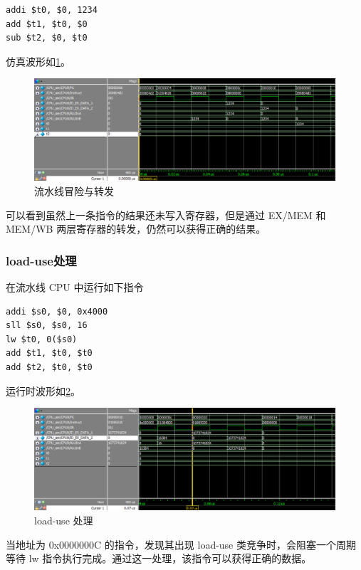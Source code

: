 \documentclass{ctexart}
\begin{document}
\begin{lstlisting}
addi $t0, $0, 1234
add $t1, $t0, $0
sub $t2, $0, $t0
\end{lstlisting}

	仿真波形如\ref{simpicture8}。

	\begin{figure}[ht]
		\centering
		\includegraphics[width = \textwidth]{PipelineTestWave1.eps}
		\caption{流水线冒险与转发}
		\label{simpicture8}
	\end{figure}		

	可以看到虽然上一条指令的结果还未写入寄存器，但是通过 EX/MEM 和 MEM/WB 两层寄存器的转发，仍然可以获得正确的结果。

	\subsubsection{load-use处理}
	
	在流水线 CPU 中运行如下指令

	\begin{lstlisting}
addi $s0, $0, 0x4000
sll $s0, $s0, 16
lw $t0, 0($s0)
add $t1, $t0, $t0
add $t2, $t0, $t0	
	\end{lstlisting}
	
运行时波形如\ref{simpicture9}。

	\begin{figure}[ht]
		\centering
		\includegraphics[width = \textwidth]{PipelineTestWave2.eps}
		\caption{ load-use 处理}
		\label{simpicture9}
	\end{figure}

当地址为 0x0000000C 的指令，发现其出现 load-use 类竞争时，会阻塞一个周期等待 lw 指令执行完成。通过这一处理，该指令可以获得正确的数据。
\end{document}
